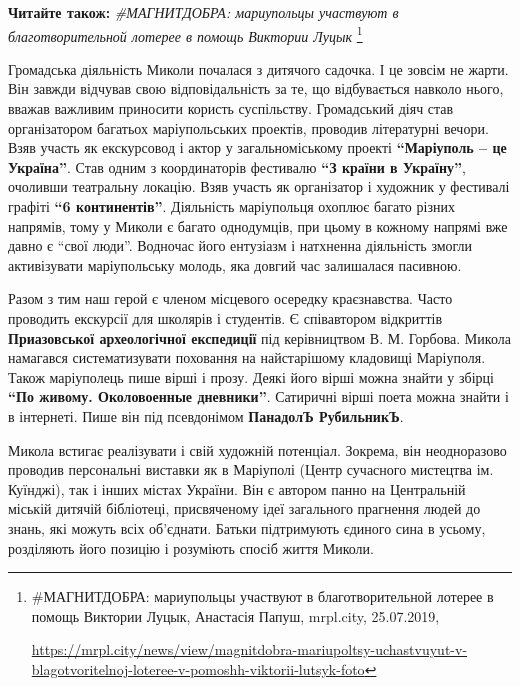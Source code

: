 \textbf{Читайте також:} \emph{\#МАГНИТДОБРА: мариупольцы участвуют в благотворительной лотерее в помощь Виктории Луцык}%
\footnote{\#МАГНИТДОБРА: мариупольцы участвуют в благотворительной лотерее в помощь Виктории Луцык, Анастасія Папуш, mrpl.city, 25.07.2019, \par%
\url{https://mrpl.city/news/view/magnitdobra-mariupoltsy-uchastvuyut-v-blagotvoritelnoj-loteree-v-pomoshh-viktorii-lutsyk-foto}}

Громадська діяльність Миколи почалася з дитячого садочка. І це зовсім не жарти.
Він завжди відчував свою відповідальність за те, що відбувається навколо нього,
вважав важливим приносити користь суспільству. Громадський діяч став
організатором багатьох маріупольських проектів, проводив літературні вечори.
Взяв участь як екскурсовод і актор у загальноміському проекті \textbf{\enquote{Маріуполь – це
Україна}}. Став одним з координаторів фестивалю \textbf{\enquote{З країни в Україну}}, очоливши
театральну локацію. Взяв участь як організатор і художник у фестивалі графіті
\textbf{\enquote{6 континентів}}. Діяльність маріупольця охоплює багато різних напрямів, тому у
Миколи є багато однодумців, при цьому в кожному напрямі вже давно є \enquote{свої
люди}. Водночас його ентузіазм і натхненна діяльність змогли активізувати
маріупольську молодь, яка довгий час залишалася пасивною.

Разом з тим наш герой є членом місцевого осередку краєзнавства. Часто проводить
екскурсії для школярів і студентів. Є співавтором відкриттів \textbf{Приазовської
археологічної експедиції} під керівництвом В. М. Горбова. Микола намагався
систематизувати поховання на найстарішому кладовищі Маріуполя. Також
маріуполець пише вірші і прозу. Деякі його вірші можна знайти у збірці \textbf{\enquote{По
живому. Околовоенные дневники}}. Сатиричні вірші поета можна знайти і в
інтернеті. Пише він під псевдонімом \textbf{ПанадолЪ РубильникЪ}.


Микола встигає реалізувати і свій художній потенціал. Зокрема, він неодноразово
проводив персональні виставки як в Маріуполі (Центр сучасного мистецтва ім.
Куїнджі), так і інших містах України. Він є автором панно на Центральній
міській дитячій бібліотеці, присвяченому ідеї загального прагнення людей до
знань, які можуть всіх об'єднати. Батьки підтримують єдиного сина в усьому,
розділяють його позицію і розуміють спосіб життя Миколи.


